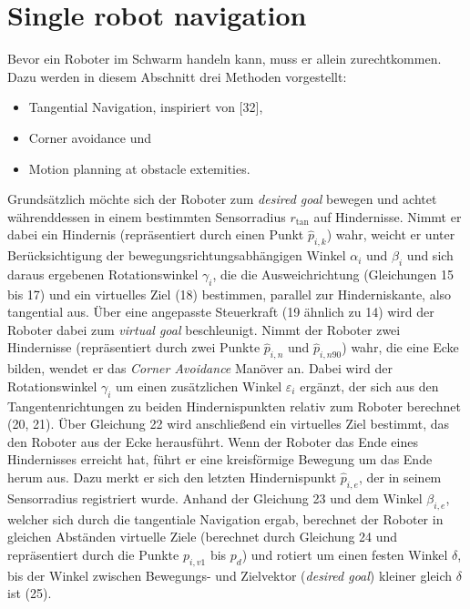 \documentclass[conference]{IEEEtran}
\begin{document}
\section{Single robot navigation}
Bevor ein Roboter im Schwarm handeln kann, muss er allein zurechtkommen. Dazu 
werden in diesem Abschnitt drei Methoden vorgestellt:
\begin{itemize}
    \item Tangential Navigation, inspiriert von [32],
    \item Corner avoidance und
    \item Motion planning at obstacle extemities.
\end{itemize}
Grundsätzlich möchte sich der Roboter zum \textit{desired goal} bewegen und achtet 
währenddessen in einem bestimmten Sensorradius \(r_{\mathrm{tan}}\) auf Hindernisse. Nimmt 
er dabei ein Hindernis (repräsentiert durch einen Punkt \( \hat{p}_{i,k} \)) wahr, weicht 
er unter Berücksichtigung der bewegungsrichtungsabhängigen Winkel \( \alpha_i \) und 
\( \beta_i \) und sich daraus ergebenen Rotationswinkel \( \gamma_i \), die die Ausweichrichtung 
(Gleichungen 15 bis 17) und ein virtuelles Ziel (18) bestimmen, parallel zur 
Hinderniskante, also tangential aus. Über eine angepasste Steuerkraft 
(19 ähnlich zu 14) wird der Roboter dabei zum \textit{virtual goal} beschleunigt.
Nimmt der Roboter zwei Hindernisse (repräsentiert durch zwei Punkte \( \hat{p}_{i,n} \) und \( \hat{p}_{i,n90} \)) 
wahr, die eine Ecke bilden, wendet er das \textit{Corner Avoidance} Manöver an. 
Dabei wird der Rotationswinkel \( \gamma_i \) um einen zusätzlichen Winkel \( \varepsilon_i \) 
ergänzt, der sich aus den Tangentenrichtungen zu beiden Hindernispunkten 
relativ zum Roboter berechnet (20, 21). Über Gleichung 22 wird anschließend 
ein virtuelles Ziel bestimmt, das den Roboter aus der Ecke herausführt.
Wenn der Roboter das Ende eines Hindernisses erreicht hat, führt er eine 
kreisförmige Bewegung um das Ende herum aus. Dazu merkt er sich den letzten 
Hindernispunkt \( \hat{p}_{i,e} \), der in seinem Sensorradius registriert wurde. Anhand der 
Gleichung 23 und dem Winkel \( \beta_{i,e} \), welcher sich durch die tangentiale Navigation 
ergab, berechnet der Roboter in gleichen Abständen virtuelle Ziele (berechnet 
durch Gleichung 24 und repräsentiert durch die Punkte \( p_{i,v1} \) bis \( p_d \)) und rotiert um einen 
festen Winkel \( \delta \), bis der Winkel zwischen Bewegungs- und Zielvektor 
(\textit{desired goal}) kleiner gleich \( \delta \) ist (25).
\end{document}
